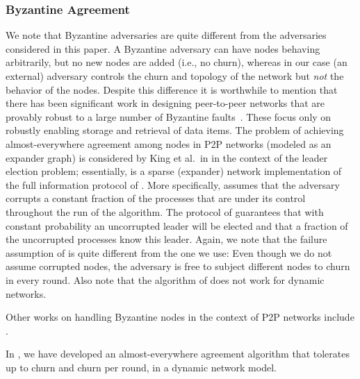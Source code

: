 \documentclass[leqno,11pt]{article}
\begin{document}
\subsubsection{Byzantine Agreement}
We note that Byzantine adversaries are quite different from the adversaries considered in this paper.  A Byzantine
adversary can have nodes behaving arbitrarily, but no new nodes  are added (i.e., no churn),
whereas in our case (an external) adversary  controls the churn and topology of
the network but {\em not} the behavior of the nodes. Despite this difference it is worthwhile to mention that
there has been significant work in designing peer-to-peer networks that
are provably robust to a large number of Byzantine
faults~\cite{FS02,HK03,NW03,Scheideler05}. These focus only on robustly enabling storage and retrieval of data items. 
The problem of achieving almost-everywhere agreement among nodes in P2P networks (modeled as an expander graph) is
considered by King et al.\ in \cite{KSSV06} in the context of the leader
election problem; essentially, \cite{KSSV06} is a sparse (expander) network
implementation of the full information protocol of \cite{KSS06}.  
More specifically, \cite{KSSV06} assumes that the
adversary corrupts a constant fraction  of the
processes that are under its control throughout the run of the algorithm.
The protocol of \cite{KSSV06} guarantees that with constant probability an
uncorrupted leader will be elected and that a 
fraction of the uncorrupted processes know this leader. Again, we note that the
failure assumption of \cite{KSSV06} is quite different from the one we use: Even though we do not assume corrupted nodes, the adversary is free
to subject different nodes to churn in every round. Also note that
the algorithm of \cite{KSSV06} does not work for dynamic networks. 

Other works on handling Byzantine nodes in the context of P2P networks include \cite{Scheideler05,awerbuch:group,fiat:dynamically,fiat:making,awerbuch:random,castro:secure,young:practical}.

In \cite{podc13}, we have developed an almost-everywhere agreement algorithm that tolerates up to  churn and  churn per round, in a dynamic network model.
\end{document}
